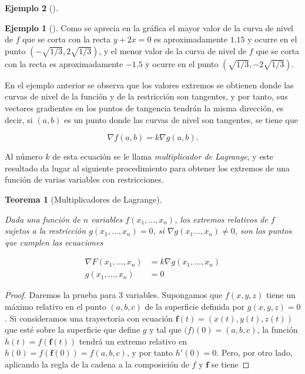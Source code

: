 \documentclass[
  a4paper,
]{scrreport}
\theoremstyle{definition}
\newtheorem{example}{Ejemplo}[chapter]
\theoremstyle{plain}
\theoremstyle{definition}
\theoremstyle{definition}
\theoremstyle{plain}
\newtheorem{theorem}{Teorema}[chapter]
\theoremstyle{plain}
\theoremstyle{remark}
\begin{document}
\begin{example}[]
\begin{example}[]
Como se aprecia en la gráfica el mayor valor de la curva de nivel de
\(f\) que se corta con la recta \(y+2x=0\) es aproximadamente \(1.15\) y
ocurre en el punto \((-\sqrt{1/3}, 2\sqrt{1/3})\), y el menor valor de
la curva de nivel de \(f\) que se corta con la recta es aproximadamente
\(-1.5\) y ocurre en el punto \((\sqrt{1/3}, -2\sqrt{1/3})\).

\end{example}

En el ejemplo anterior se observa que los valores extremos se obtienen
donde las curvas de nivel de la función y de la restricción son
tangentes, y por tanto, sus vectores gradientes en los puntos de
tangencia tendrán la misma dirección, es decir, si \((a,b)\) es un punto
donde las curvas de nivel son tangentes, se tiene que

\[
\nabla f(a,b) = k \nabla g(a,b).
\]

Al número \(k\) de esta ecuación se le llama \emph{multiplicador de
Lagrange}, y este resultado da lugar al siguiente procedimiento para
obtener los extremos de una función de varias variables con
restricciones.

\begin{theorem}[Multiplicadores de
Lagrange]\protect\hypertarget{thm-multiplicadores-lagrange}{}\label{thm-multiplicadores-lagrange}

Dada una función de \(n\) variables \(f(x_1,\ldots,x_n)\), los extremos
relativos de \(f\) sujetos a la restricción \(g(x_1,\ldots,x_n)=0\), si
\(\nabla g(x_1\ldots,x_n)\neq 0\), son los puntos que cumplen las
ecuaciones

\begin{align*}
\nabla F(x_1,\ldots,x_n) &= k\nabla g(x_1,\ldots,x_n) \\
g(x_1,\ldots, x_n) &= 0 
\end{align*}

\end{theorem}

\begin{tcolorbox}[enhanced jigsaw, leftrule=.75mm, colbacktitle=quarto-callout-note-color!10!white, toprule=.15mm, opacityback=0, opacitybacktitle=0.6, toptitle=1mm, breakable, bottomtitle=1mm, colframe=quarto-callout-note-color-frame, rightrule=.15mm, titlerule=0mm, title=\textcolor{quarto-callout-note-color}{\faInfo}\hspace{0.5em}{Demostración}, arc=.35mm, left=2mm, bottomrule=.15mm, colback=white, coltitle=black]

\begin{proof}
Daremos la prueba para 3 variables. Supongamos que \(f(x,y,z)\) tiene un
máximo relativo en el punto \((a,b,c)\) de la superficie definida por
\(g(x,y,z)=0\). Si consideramos una trayectoria con ecuación
\(\mathbf{f}(t)=(x(t),y(t),z(t))\) que esté sobre la superficie que
define \(g\) y tal que \(\mathbf(f)(0)=(a,b,c)\), la función
\(h(t)=f(\mathbf{f}(t))\) tendrá un extremo relativo en
\(h(0)=f(\mathbf{f}(0))=f(a,b,c)\), y por tanto \(h'(0)=0\). Pero, por
otro lado, aplicando la regla de la cadena a la composición de \(f\) y
\(\mathbf{f}\) se tiene


\end{proof}
\end{tcolorbox}
\end{example}
\end{document}
